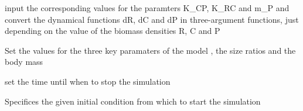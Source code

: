 \documentclass[letterpaper,10pt,english]{sphinxmanual}
\begin{document}
\begin{fulllineitems}

\begin{fulllineitems}
\label{Analisis/SimulationDynamics:SimulationDynamics.Dynamics.setDynamicFunction}
input the corresponding values for the paramters K\_CP, K\_RC and m\_P and convert the dynamical functions dR, dC 
and dP in three-argument functions, just depending on the value of the biomass densities R, C and P

\end{fulllineitems}


\begin{fulllineitems}
\label{Analisis/SimulationDynamics:SimulationDynamics.Dynamics.setParamVals}
Set the values for the three key paramaters of the model , the size ratios and the body mass

\end{fulllineitems}


\begin{fulllineitems}
\label{Analisis/SimulationDynamics:SimulationDynamics.Dynamics.setfinalTime}
set the time until when to stop the simulation

\end{fulllineitems}


\begin{fulllineitems}
\label{Analisis/SimulationDynamics:SimulationDynamics.Dynamics.setinitCondition}
Specifices the given initial condition from which to start the simulation

\end{fulllineitems}


\begin{fulllineitems}
\label{Analisis/SimulationDynamics:SimulationDynamics.Dynamics.setseparation}
\end{fulllineitems}


\end{fulllineitems}
\end{document}

